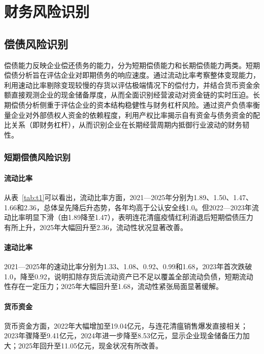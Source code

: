 \documentclass[12pt,a4paper,fontset=windows,UTF8]{ctexart}
\begin{document}
\section{财务风险识别}
\subsection{偿债风险识别}
偿债能力反映企业偿还债务的能力，分为短期偿债能力和长期偿债能力两类。短期偿债分析旨在评估企业对即期债务的响应速度。通过流动比率考察整体变现能力，利用速动比率剔除变现较慢的存货以评估极端情况下的偿付力，并结合货币资金余额直接观测企业的现金储备厚度，从而全面识别经营波动对资金链的实时压迫。长期偿债分析侧重于评估企业的资本结构稳健性与财务杠杆风险。通过资产负债率衡量企业对外部债权人资金的依赖程度，利用产权比率揭示自有资金与债务资金的配比关系（即财务杠杆），从而识别企业在长期经营周期内抵御行业波动的财务韧性。

\subsubsection{短期偿债风险识别}
\paragraph*{流动比率}
从表~\ref{tab:t1}可以看出，流动比率方面，2021—2025年分别为1.89、1.50、1.47、1.66和2.36，总体呈先降后升态势，各年均高于公认安全线1.0。但2022—2023年流动比率明显下滑（由1.89降至1.47），表明连花清瘟疫情红利消退后短期偿债压力有所上升，2025年大幅回升至2.36，流动性状况显著改善。

\paragraph*{速动比率}
2021—2025年的速动比率分别为1.33、1.08、0.92、0.99和1.68，2023年首次跌破1.0，降至0.92，说明扣除存货后流动资产已不足以覆盖全部流动负债，短期流动性存在一定压力；2025年大幅回升至1.68，流动性紧张局面显著缓解。

\paragraph*{货币资金}
货币资金方面，2022年大幅增加至19.04亿元，与连花清瘟销售爆发直接相关；2023年骤降至9.41亿元，2024年进一步降至8.53亿元，显示企业现金储备压力加大；2025年回升至11.05亿元，现金状况有所改善。
\end{document}
